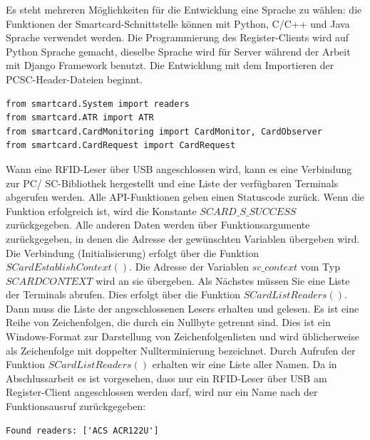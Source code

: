 Es steht mehreren Möglichkeiten für die Entwicklung eine Sprache zu wählen: die Funktionen der Smartcard-Schnittstelle können mit Python, C/C++ und Java Sprache verwendet werden. Die Programmierung des Register-Clients wird auf Python Sprache gemacht, dieselbe Sprache wird für Server während der Arbeit mit Django Framework benutzt. Die Entwicklung mit dem Importieren der PCSC-Header-Dateien beginnt. 
\begin{lstlisting}[caption={[Importieren der PCSC-Header-Dateien] },captionpos=b]
from smartcard.System import readers
from smartcard.ATR import ATR
from smartcard.CardMonitoring import CardMonitor, CardObserver
from smartcard.CardRequest import CardRequest
\end{lstlisting}
Wann eine RFID-Leser über USB angeschlossen wird, kann es eine Verbindung zur PC/ SC-Bibliothek hergestellt und eine Liste der verfügbaren Terminals abgerufen werden. Alle API-Funktionen geben einen Statuscode zurück. Wenn die Funktion erfolgreich ist, wird die Konstante  $SCARD\_S\_SUCCESS$  zurückgegeben. Alle anderen Daten werden über Funktionsargumente zurückgegeben, in denen die Adresse der gewünschten Variablen übergeben wird. Die Verbindung (Initialisierung) erfolgt über die Funktion $SCardEstablishContext()$\cite[p. 101]{chirico:smart_card}. Die Adresse der Variablen $sc\_context$ vom Typ $SCARDCONTEXT$ wird an sie übergeben. Als Nächstes müssen Sie eine Liste der Terminals abrufen. Dies erfolgt über die Funktion $SCardListReaders()$. Dann muss die Liste der angeschlossenen Lesers erhalten und gelesen. Es ist eine Reihe von Zeichenfolgen, die durch ein Nullbyte getrennt sind. Dies ist ein Windows-Format zur Darstellung von Zeichenfolgenlisten und wird üblicherweise als Zeichenfolge mit doppelter Nullterminierung bezeichnet. Durch Aufrufen der Funktion $SCardListReaders()$ erhalten wir eine Liste aller Namen\cite[p. 102]{chirico:smart_card}. Da in Abschlussarbeit es ist vorgesehen, dass nur ein RFID-Leser über USB am Register-Client angeschlossen werden darf, wird nur ein Name nach der Funktionsausruf zurückgegeben:
\begin{lstlisting}
Found readers: ['ACS ACR122U']
\end{lstlisting}

